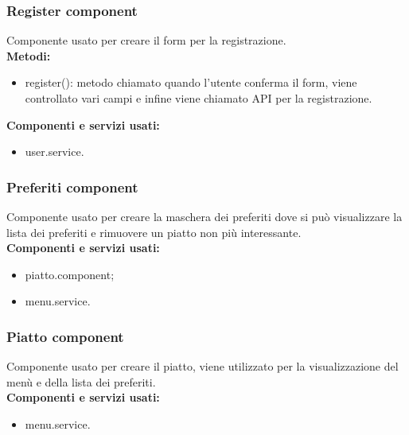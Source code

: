 \subsubsection{Register component}
Componente usato per creare il form per la registrazione.\\
\textbf{Metodi:}
\begin{itemize}
    \item register(): metodo chiamato quando l'utente conferma il form, viene controllato vari campi e infine viene chiamato API per la registrazione.
\end{itemize}
\textbf{Componenti e servizi usati:}
\begin{itemize}
    \item user.service.
\end{itemize}

\subsubsection{Preferiti component}
Componente usato per creare la maschera dei preferiti dove si può visualizzare la lista dei preferiti e rimuovere un piatto non più interessante.\\
\textbf{Componenti e servizi usati:}
\begin{itemize}
    \item piatto.component;
    \item menu.service.
\end{itemize}

\subsubsection{Piatto component}
Componente usato per creare il piatto, viene utilizzato per la visualizzazione del menù e della lista dei preferiti.\\
\textbf{Componenti e servizi usati:}
\begin{itemize}
    \item menu.service.
\end{itemize}

